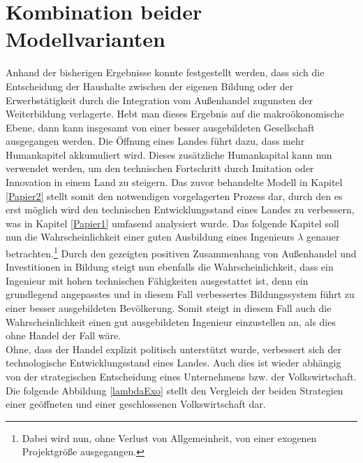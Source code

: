 \chapter{Kombination beider Modellvarianten}\label{Kombi}
Anhand der bisherigen Ergebnisse konnte festgestellt werden, dass sich die Entscheidung
der Haushalte zwischen der eigenen Bildung oder der Erwerbstätigkeit durch die Integration vom Au{\ss}enhandel zugunsten der Weiterbildung verlagerte. Hebt man dieses Ergebnis auf die makroökonomische Ebene, dann kann insgesamt von einer besser ausgebildeten Gesellschaft ausgegangen werden. Die Öffnung eines Landes führt dazu, dass mehr Humankapitel akkumuliert wird. Dieses zusätzliche Humankapital kann nun verwendet werden, um den technischen Fortschritt durch Imitation oder Innovation in einem Land zu steigern. Das zuvor behandelte Modell in Kapitel \ref{Papier2} stellt somit den notwendigen vorgelagerten Prozess dar, durch den es erst möglich wird den technischen Entwicklungsstand eines Landes zu verbessern, was in Kapitel \ref{Papier1} umfasend analysiert wurde.\newline 
Das folgende Kapitel soll nun die Wahrscheinlichkeit einer guten Ausbildung eines Ingenieurs $\lambda$ genauer betrachten.\footnote{Dabei wird nun, ohne Verlust von Allgemeinheit, von einer exogenen Projektgrö{\ss}e ausgegangen.} Durch den gezeigten positiven Zusammenhang von Au{\ss}enhandel und Investitionen in Bildung steigt nun ebenfalls die Wahrscheinlichkeit, dass ein Ingenieur mit hohen technischen Fähigkeiten ausgestattet ist, denn ein grundlegend angepasstes und in diesem Fall verbessertes Bildungssystem führt zu einer besser ausgebildeten Bevölkerung. Somit steigt in diesem Fall auch die Wahrscheinlichkeit einen gut ausgebildeten Ingenieur einzustellen an, als dies ohne Handel der Fall wäre.  \\
Ohne, dass der Handel explizit politisch unterstützt wurde, verbessert sich der technologische Entwicklungsstand eines Landes. Auch dies ist wieder abhängig von der strategischen Entscheidung eines Unternehmens bzw. der Volkswirtschaft. Die folgende Abbildung \ref{lambdaExo} stellt den Vergleich der beiden Strategien einer geöffneten und einer geschlossenen Volkswirtschaft dar.\\


